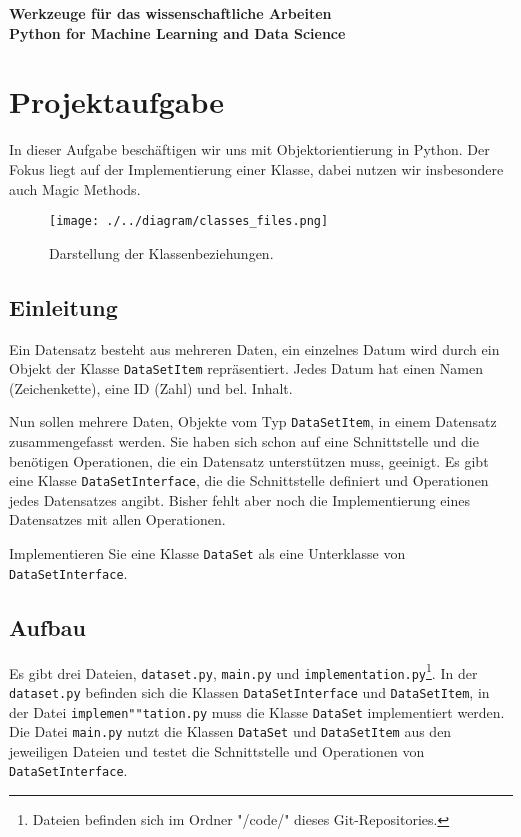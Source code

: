 \documentclass[
    12pt, %
    a4paper, %
    parskip=full %
]{scrartcl}
\begin{document}
    \begin{center}
        \thispagestyle{empty}
            \Large\textbf{Werkzeuge für das wissenschaftliche Arbeiten}\\
            \small\textbf{Python for Machine Learning and Data Science}\\
    \end{center}

\clearpage

\renewcommand{\contentsname}{Inhaltsverzeichnis}
\tableofcontents

\clearpage

\section{Projektaufgabe}
In dieser Aufgabe beschäftigen wir uns mit Objektorientierung in Python.
Der Fokus liegt auf der Implementierung einer Klasse, dabei nutzen wir insbesondere auch Magic Methods.

\begin{figure}[h]
    \centering
    \texttt{[image: ./../diagram/classes\_files.png]}
    \caption{Darstellung der Klassenbeziehungen.}
    \label{fig:dur}
\end{figure}

\subsection{Einleitung}
Ein Datensatz besteht aus mehreren Daten, ein einzelnes Datum wird durch ein Objekt der Klasse \texttt{DataSetItem} repräsentiert.
Jedes Datum hat einen Namen (Zeichenkette), eine ID (Zahl) und bel. Inhalt.

Nun sollen mehrere Daten, Objekte vom Typ \texttt{DataSetItem}, in einem Datensatz zusammengefasst werden.
Sie haben sich schon auf eine Schnittstelle und die benötigen Operationen, die ein Datensatz unterstützen muss, geeinigt.
Es gibt eine Klasse \texttt{DataSetInterface}, die die Schnittstelle definiert und Operationen jedes Datensatzes angibt.
Bisher fehlt aber noch die Implementierung eines Datensatzes mit allen Operationen.

Implementieren Sie eine Klasse \texttt{DataSet} als eine Unterklasse von \texttt{DataSetInterface}.

\subsection{Aufbau}
Es gibt drei Dateien, \texttt{dataset.py}, \texttt{main.py} und \texttt{implementation.py}\footnote{Dateien befinden sich im Ordner "/code/" dieses Git-Repositories.}.
In der \texttt{dataset.py} befinden sich die Klassen \texttt{DataSetInterface} und \texttt{DataSetItem},
in der Datei \texttt{implemen""tation.py} muss die Klasse \texttt{DataSet} implementiert werden.
Die Datei \texttt{main.py} nutzt die Klassen \texttt{DataSet} und \texttt{DataSetItem} aus den jeweiligen Dateien und testet die Schnittstelle und Operationen von \texttt{DataSetInterface}.
\end{document}
